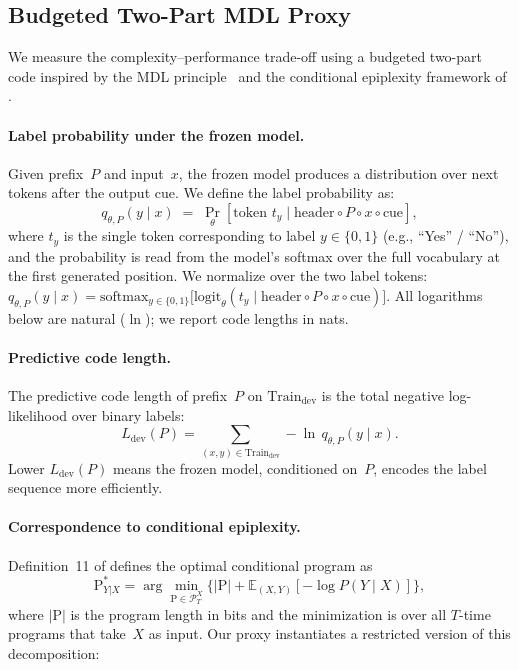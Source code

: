 \documentclass[preprint]{article}
\newcommand{\Ldev}{L_{\text{dev}}}
\newcommand{\Traindev}{\text{Train}_{\text{dev}}}
\begin{document}
\subsection{Budgeted Two-Part MDL Proxy}
\label{sec:mdl_proxy}

We measure the complexity--performance trade-off using a budgeted two-part code inspired by the MDL principle~\citep{rissanen2004mdl, grunwald2007mdl} and the conditional epiplexity framework of \citet{finzi2026epiplexity}.

\paragraph{Label probability under the frozen model.}
Given prefix~$P$ and input~$x$, the frozen model produces a distribution over next tokens after the output cue.
We define the label probability as:
\begin{equation}
q_{\theta,P}(y \mid x) \;=\; \Pr_\theta[\text{token } t_y \mid \text{header} \circ P \circ x \circ \text{cue}],
\label{eq:label_prob}
\end{equation}
where $t_y$ is the single token corresponding to label $y \in \{0,1\}$ (e.g., ``Yes'' / ``No''), and the probability is read from the model's softmax over the full vocabulary at the first generated position.
We normalize over the two label tokens:
$q_{\theta,P}(y \mid x) \!=\! \text{softmax}_{y \in \{0,1\}}\bigl[\text{logit}_\theta(t_y \mid \text{header} \!\circ\! P \!\circ\! x \!\circ\! \text{cue})\bigr]$.
All logarithms below are natural ($\ln$); we report code lengths in nats.

\paragraph{Predictive code length.}
The predictive code length of prefix~$P$ on $\Traindev$ is the total negative log-likelihood over binary labels:
\begin{equation}
\Ldev(P) = \sum_{(x,y) \in \Traindev} -\ln\, q_{\theta,P}(y \mid x).
\label{eq:ldev}
\end{equation}
Lower $\Ldev(P)$ means the frozen model, conditioned on~$P$, encodes the label sequence more efficiently.

\paragraph{Correspondence to conditional epiplexity.}
Definition~11 of \citet{finzi2026epiplexity} defines the optimal conditional program as
\begin{equation}
\mathrm{P}^*_{Y|X} = \arg\min_{\mathrm{P} \in \mathcal{P}^X_T} \bigl\{|\mathrm{P}| + \mathbb{E}_{(X,Y)}[-\log P(Y \mid X)]\bigr\},
\label{eq:finzi_def11}
\end{equation}
where $|\mathrm{P}|$ is the program length in bits and the minimization is over all $T$-time programs that take~$X$ as input.
Our proxy instantiates a restricted version of this decomposition:
\end{document}
